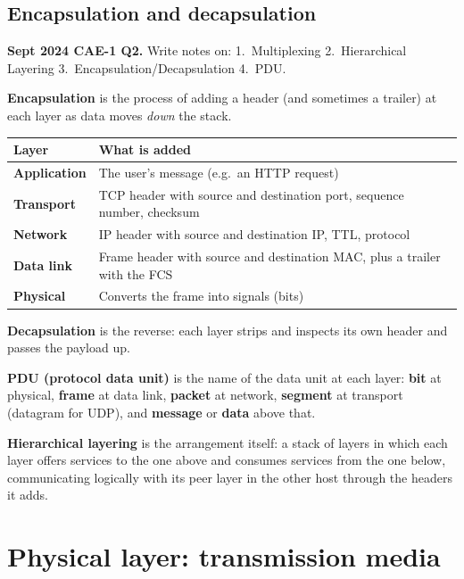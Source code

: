 \documentclass[11pt,a4paper]{article}
\begin{document}
\subsection{Encapsulation and decapsulation}

\begin{pyqbox}
\textbf{Sept 2024 CAE-1 Q2.} Write notes on: 1.~Multiplexing 2.~Hierarchical Layering 3.~Encapsulation/Decapsulation 4.~PDU.
\end{pyqbox}

\begin{solbox}
\textbf{Encapsulation} is the process of adding a header (and sometimes a trailer) at each layer as data moves \emph{down} the stack.

\begin{center}\small
\begin{tabularx}{\textwidth}{>{\bfseries}p{} X}
\toprule Layer & What is added\\
\midrule
Application & The user's message (e.g.\ an HTTP request)\\
Transport & TCP header with source and destination port, sequence number, checksum\\
Network & IP header with source and destination IP, TTL, protocol\\
Data link & Frame header with source and destination MAC, plus a trailer with the FCS\\
Physical & Converts the frame into signals (bits)\\
\bottomrule
\end{tabularx}
\end{center}

\textbf{Decapsulation} is the reverse: each layer strips and inspects its own header and passes the payload up.

\textbf{PDU (protocol data unit)} is the name of the data unit at each layer: \textbf{bit} at physical, \textbf{frame} at data link, \textbf{packet} at network, \textbf{segment} at transport (datagram for UDP), and \textbf{message} or \textbf{data} above that.

\textbf{Hierarchical layering} is the arrangement itself: a stack of layers in which each layer offers services to the one above and consumes services from the one below, communicating logically with its peer layer in the other host through the headers it adds.
\end{solbox}

\section{Physical layer: transmission media}
\end{document}
